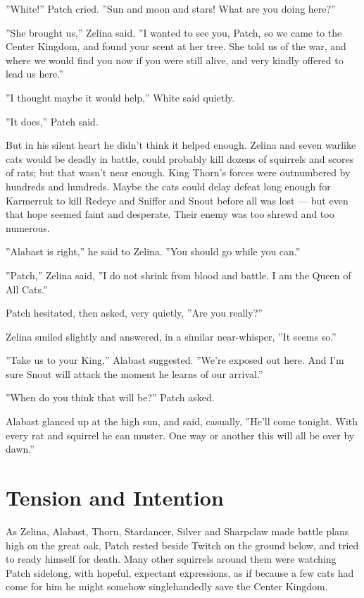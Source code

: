 \documentclass[12pt]{book}
\begin{document}
''White!'' Patch cried. ''Sun and moon and stars! What are you doing here?''

''She brought us,'' Zelina said. ''I wanted to see you, Patch, so we came to the Center Kingdom, and found your scent at her tree. She told us of the war, and where we would find you now if you were still alive, and very kindly offered to lead us here.''

''I thought maybe it would help,'' White said quietly.

''It does,'' Patch said.

But in his silent heart he didn't think it helped enough. Zelina and seven warlike cats would be deadly in battle, could probably kill dozens of squirrels and scores of rats; but that wasn't near enough. King Thorn's forces were outnumbered by hundreds and hundreds. Maybe the cats could delay defeat long enough for Karmerruk to kill Redeye and Sniffer and Snout before all was lost ---
but even that hope seemed faint and desperate. Their enemy was too shrewd and too numerous.

''Alabast is right,'' he said to Zelina. ''You should go while you can.''

''Patch,'' Zelina said, ''I do not shrink from blood and battle. I am the Queen of All Cats.''

Patch hesitated, then asked, very quietly, ''Are you really?''

Zelina smiled slightly and answered, in a similar near-whisper, ''It seems so.''

''Take us to your King,'' Alabast suggested. ''We're exposed out here. And I'm sure Snout will attack the moment he learns of our arrival.''

''When do you think that will be?'' Patch asked.

Alabast glanced up at the high sun, and said, casually, ''He'll come tonight. With every rat and squirrel he can muster. One way or another this will all be over by dawn.''


\section{Tension and Intention}

As Zelina, Alabast, Thorn, Stardancer, Silver and Sharpclaw made battle plans high on the great oak, Patch rested beside Twitch on the ground below, and tried to ready himself for death. Many other squirrels around them were watching Patch sidelong, with hopeful, expectant expressions, as if because a few cats had come for him he might somehow singlehandedly save the Center Kingdom.
\end{document}
